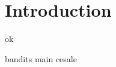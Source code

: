 \documentclass[
    12pt,
    a4paper,
    twoside,
    openright,
]{report} %
\begin{document}



\setcounter{tocdepth}{1}
\tableofcontents
\cleardoublepage

\chapter{Introduction}
ok \cite{grover1996}

{bandits}
{main}
{cesale}


\begin{sloppypar}
    \printbibliography[
        heading=bibintoc,
        title={References}
    ]
\end{sloppypar}
\end{document}
